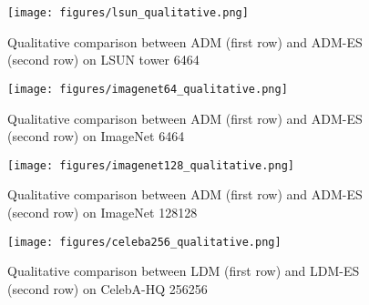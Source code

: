 \documentclass{article} \usepackage{iclr2024_conference,times}
\begin{document}
\begin{figure}[ht]
\vskip 0.0in
\begin{center}
\centerline{\texttt{[image: figures/lsun\_qualitative.png]}}
\caption{Qualitative comparison between ADM (first row) and ADM-ES (second row) on LSUN tower 6464 
}
\label{fig: lsun_qualitative}
\end{center}
\vskip -0.2in
\end{figure}



\begin{figure}[ht]
\vskip 0.0in
\begin{center}
\centerline{\texttt{[image: figures/imagenet64\_qualitative.png]}}
\caption{Qualitative comparison between ADM (first row) and ADM-ES (second row) on ImageNet 6464 
}
\label{fig: imagenet64_qualitative}
\end{center}
\vskip -0.2in
\end{figure}



\begin{figure}[ht]
\vskip 0.0in
\begin{center}
\centerline{\texttt{[image: figures/imagenet128\_qualitative.png]}}
\caption{Qualitative comparison between ADM (first row) and ADM-ES (second row) on ImageNet 128128 
}
\label{fig: imagenet128_qualitative}
\end{center}
\vskip -0.2in
\end{figure}



\begin{figure}[ht]
\vskip 0.0in
\begin{center}
\centerline{\texttt{[image: figures/celeba256\_qualitative.png]}}
\caption{Qualitative comparison between LDM (first row) and LDM-ES (second row) on CelebA-HQ 256256 
}
\label{fig: celeba256_qualitative}
\end{center}
\vskip -0.2in
\end{figure}
\end{document}

